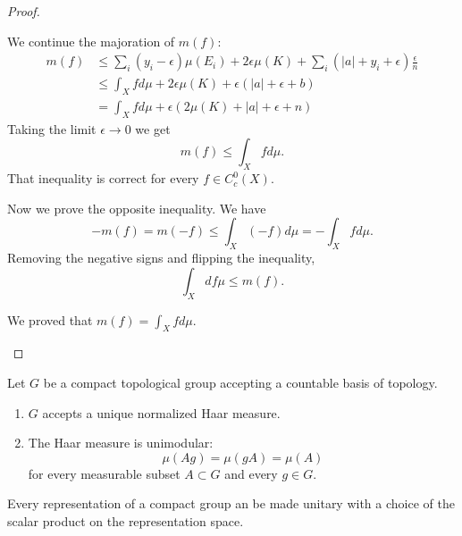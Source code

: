 \begin{proof}
\begin{subproof}
            We continue the majoration of \( m(f)\):
            \begin{subequations}
                \begin{align}
                    m(f)&\leq \sum_i(y_i-\epsilon)\mu(E_i)+2\epsilon\mu(K)+\sum_i(| a |+y_i+\epsilon)\frac{ \epsilon }{ n }\\
                    &\leq\int_Xfd\mu+2\epsilon\mu(K)+\epsilon(| a |+\epsilon+b)\\
                    &=\int_Xfd\mu+\epsilon(2\mu(K)+| a |+\epsilon+n)
                \end{align}
            \end{subequations}
            Taking the limit \( \epsilon\to 0\) we get
            \begin{equation}
                m(f)\leq \int_Xfd\mu.
            \end{equation}
            That inequality is correct for every \( f\in C^0_c(X)\).

            Now we prove the opposite inequality. We have
            \begin{equation}
                -m(f)=m(-f)\leq \int_X(-f)d\mu=-\int_Xfd\mu.
            \end{equation}
            Removing the negative signs and flipping the inequality,
            \begin{equation}
                \int_Xdf\mu\leq m(f).
            \end{equation}
            
            We proved that \( m(f)=\int_Xfd\mu\).
    \end{subproof}
\end{proof}



\begin{theorem} \label{ThoBZBooOTxqcI}
    Let \( G\) be a compact topological group accepting a countable basis of topology.
    \begin{enumerate}
        \item
            \( G\) accepts a unique normalized Haar measure.
        \item
            The Haar measure is unimodular:
	\begin{equation}
		\mu(Ag)=\mu(gA)=\mu(A)
	\end{equation}
    for every measurable subset \( A\subset G\) and every \( g\in G\).
    \end{enumerate}
\end{theorem}




\begin{theorem}     \label{THOooCXARooScQJdU}
    Every representation of a compact group an be made unitary with a choice of the scalar product on the representation space.
\end{theorem}

